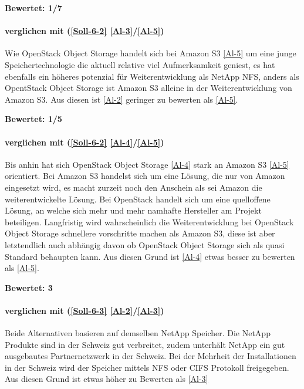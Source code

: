 \textbf{Bewertet: 1/7}

\paragraph*{  verglichen mit  (\ref{Soll-6-2} \ref{Al-3}/\ref{Al-5})}
Wie OpenStack Object Storage handelt sich bei Amazon S3 \ref{Al-5} um eine junge Speichertechnologie die aktuell relative viel Aufmerksamkeit geniest, es hat ebenfalls ein höheres potenzial für Weiterentwicklung als NetApp NFS, anders als OpentStack Object Storage ist Amazon S3 alleine in der Weiterentwicklung von Amazon S3. Aus diesen ist  \ref{Al-2} geringer zu bewerten als  \ref{Al-5}.

\textbf{Bewertet: 1/5}

\paragraph*{  verglichen mit  (\ref{Soll-6-2} \ref{Al-4}/\ref{Al-5})}
Bis anhin hat sich OpenStack Object Storage \ref{Al-4} stark an Amazon S3 \ref{Al-5} orientiert. Bei Amazon S3 handelst sich um eine Lösung, die nur von Amazon eingesetzt wird, es macht zurzeit noch den Anschein als sei Amazon die weiterentwickelte Lösung. Bei OpenStack handelt sich um eine quelloffene Lösung, an welche sich mehr und mehr namhafte Hersteller am Projekt beteiligen. Langfristig wird wahrscheinlich die Weiterentwicklung bei OpenStack Object Storage schnellere vorschritte machen als Amazon S3, diese ist aber letztendlich auch abhängig davon ob OpenStack Object Storage sich als quasi Standard behaupten kann.
Aus diesen Grund ist \ref{Al-4} etwas besser zu bewerten als \ref{Al-5}.

\textbf{Bewertet: 3}


\paragraph*{  verglichen mit  (\ref{Soll-6-3} \ref{Al-2}/\ref{Al-3})}
Beide Alternativen basieren auf demselben NetApp Speicher. Die NetApp Produkte sind in der Schweiz gut verbreitet, zudem unterhält NetApp ein gut ausgebautes Partnernetzwerk in der Schweiz. Bei der Mehrheit der Installationen in der Schweiz wird der Speicher mittels NFS oder CIFS Protokoll freigegeben. Aus diesen Grund ist  etwas höher zu Bewerten als  \ref{Al-3}

